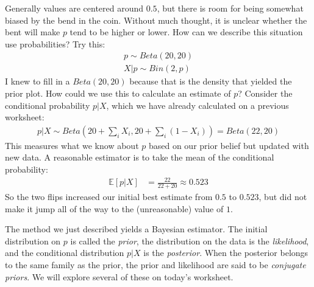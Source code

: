 \documentclass{tufte-handout}
\begin{document}
Generally values are centered around $0.5$, but there is room for being
somewhat biased by the bend in the coin. Without much thought, it is
unclear whether the bent will make $p$ tend to be higher or lower. How
can we describe this situation use probabilities? Try this:
\begin{align*}
p \sim Beta(20, 20) \\
X | p \sim Bin(2, p)
\end{align*}
I knew to fill in a $Beta(20,20)$ because that is the density that yielded
the prior plot. How could we use this to calculate an estimate of $p$? Consider
the conditional probability $p | X$, which we have already calculated on
a previous worksheet:
\begin{align*}
p | X \sim Beta(20 + \sum_i X_i, 20 + \sum_i (1 - X_i)) = Beta (22, 20)
\end{align*}
This measures what we know about $p$ based on our prior belief but updated
with new data. A reasonable estimator is to take the mean of the conditional
probability:
\begin{align*}
\mathbb{E} \left[ p | X \right] &= \frac{22}{22 + 20} \approx 0.523
\end{align*}
So the two flips increased our initial best estimate from $0.5$ to $0.523$,
but did not make it jump all of the way to the (unreasonable) value of $1$.

The method we just described yields a Bayesian estimator. The initial distribution
on $p$ is called the \textit{prior}, the distribution on the data is the \textit{likelihood},
and the conditional distribution $p|X$ is the \textit{posterior}. When the
posterior belongs to the same family as the prior, the prior and likelihood
are said to be \textit{conjugate priors}. We will explore several of these
on today's worksheet.
\end{document}
